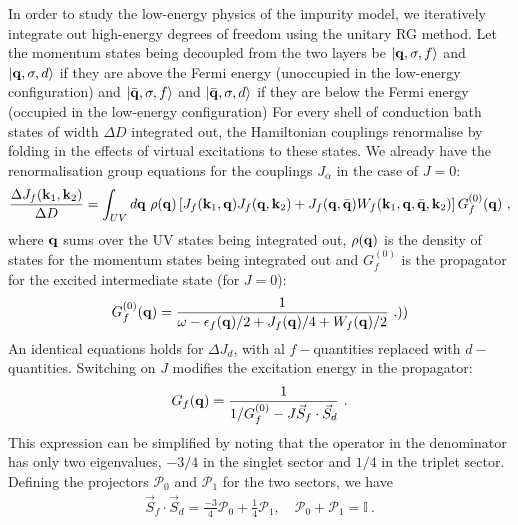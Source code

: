 \documentclass[%
reprint,
superscriptaddress,
groupedaddress,
superscriptaddress,
onecolumn,
10pt
]{revtex4-2}
\begin{document}
In order to study the low-energy physics of the impurity model, we iteratively integrate out high-energy degrees of freedom using the unitary RG method. Let the momentum states being decoupled from the two layers be \(\ket{{\bf q},\sigma,f}\) and \(\ket{{\bf q},\sigma,d}\) if they are above the Fermi energy (unoccupied in the low-energy configuration) and \(\ket{\bar{\bf q},\sigma,f}\) and \(\ket{\bar{\bf q},\sigma,d}\) if they are below the Fermi energy (occupied in the low-energy configuration)
For every shell of conduction bath states of width \(\Delta D\) integrated out, the Hamiltonian couplings renormalise by folding in the effects of virtual excitations to these states. We already have the renormalisation group equations for the couplings \(J_\alpha\) in the case of \(J=0\):
\begin{equation}\begin{aligned}
	\frac{\Delta J_f({\bf k}_1, {\bf k}_2)}{\Delta D} = \int_{UV} d{\bf q} ~\rho({\bf q}) \left[J_f({\bf k}_1, {\bf q})J_f({\bf q}, {\bf k}_2) + J_f({\bf q}, \bar {\bf q})W_f({\bf k}_1, {\bf q}, \bar {\bf q}, {\bf k}_2)\right] G_f^{(0)}({\bf q})~,
\end{aligned}\end{equation}
where \({\bf q}\) sums over the UV states being integrated out, \(\rho({\bf q})\) is the density of states for the momentum states being integrated out and \(G_f^{(0)}\) is the propagator for the excited intermediate state (for \(J=0\)):
\begin{equation}\begin{aligned}
	G_f^{(0)}({\bf q}) = \frac{1}{\omega - \epsilon_f({\bf q}) / 2 + J_f({\bf q}) / 4 + W_f({\bf q}) / 2}~.))
\end{aligned}\end{equation}
An identical equations holds for \(\Delta J_d\), with al \(f-\)quantities replaced with \(d-\)quantities. Switching on \(J\) modifies the excitation energy in the propagator:
\begin{equation}\begin{aligned}
	G_f({\bf q}) = \frac{1}{1/G_f^{(0)} - J \vec{S}_f\cdot\vec{S}_d}~.
\end{aligned}\end{equation}
This expression can be simplified by noting that the operator in the denominator has only two eigenvalues, \(-3/4\) in the singlet sector and \(1/4\) in the triplet sector. Defining the projectors \(\mathcal{P}_0\) and \(\mathcal{P}_1\) for the two sectors, we have
\begin{equation}\begin{aligned}
	\vec{S}_f\cdot\vec{S}_d = \frac{-3}{4}\mathcal{P}_0 + \frac{1}{4}\mathcal{P}_1, \quad \mathcal{P}_0 + \mathcal{P}_1 = \mathbb{I}~.
\end{aligned}\end{equation}
\end{document}
